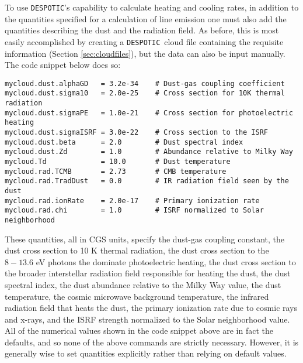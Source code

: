 \documentclass[12pt]{article}
\newcommand{\despotic}{\texttt{DESPOTIC}}
\begin{document}
To use \despotic's capability to calculate heating and cooling rates, in addition to the quantities specified for a calculation of line emission one must also add the quantities describing the dust and the radiation field. As before, this is most easily accomplished by creating a \despotic\ cloud file containing the requisite information (Section \ref{sec:cloudfiles}), but the data can also be input manually. The code snippet below does so:
\begin{verbatim}
mycloud.dust.alphaGD   = 3.2e-34    # Dust-gas coupling coefficient
mycloud.dust.sigma10   = 2.0e-25    # Cross section for 10K thermal radiation
mycloud.dust.sigmaPE   = 1.0e-21    # Cross section for photoelectric heating
mycloud.dust.sigmaISRF = 3.0e-22    # Cross section to the ISRF
mycloud.dust.beta      = 2.0        # Dust spectral index
mycloud.dust.Zd        = 1.0        # Abundance relative to Milky Way
mycloud.Td             = 10.0       # Dust temperature
mycloud.rad.TCMB       = 2.73       # CMB temperature
mycloud.rad.TradDust   = 0.0        # IR radiation field seen by the dust
mycloud.rad.ionRate    = 2.0e-17    # Primary ionization rate
mycloud.rad.chi        = 1.0        # ISRF normalized to Solar neighborhood
\end{verbatim}
These quantities, all in CGS units, specify the dust-gas coupling constant, the dust cross section to 10 K thermal radiation, the dust cross section to the $8-13.6$ eV photons the dominate photoelectric heating, the dust cross section to the broader interstellar radiation field responsible for heating the dust, the dust spectral index, the dust abundance relative to the Milky Way value, the dust temperature, the cosmic microwave background temperature, the infrared radiation field that heats the dust, the primary ionization rate due to cosmic rays and x-rays, and the ISRF strength normalized to the Solar neighborhood value. All of the numerical values shown in the code snippet above are in fact the defaults, and so none of the above commands are strictly necessary. However, it is generally wise to set quantities explicitly rather than relying on default values.
\end{document}
